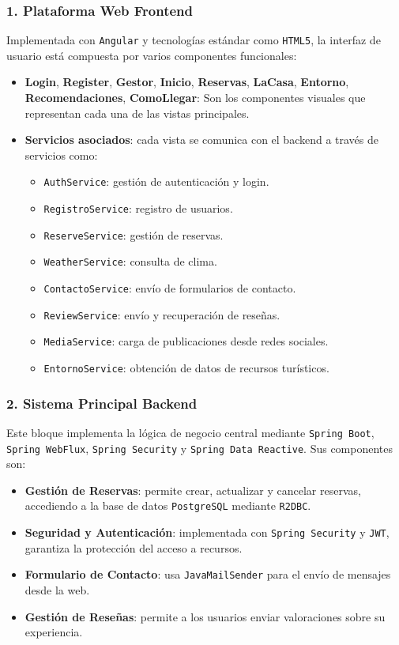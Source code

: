 \subsubsection*{1. Plataforma Web Frontend}
Implementada con \texttt{Angular} y tecnologías estándar como \texttt{HTML5}, la interfaz de usuario está compuesta por varios componentes funcionales:

\begin{itemize}
\item \textbf{Login}, \textbf{Register}, \textbf{Gestor}, \textbf{Inicio}, \textbf{Reservas}, \textbf{LaCasa}, \textbf{Entorno}, \textbf{Recomendaciones}, \textbf{ComoLlegar}:
Son los componentes visuales que representan cada una de las vistas principales.

\item \textbf{Servicios asociados}: cada vista se comunica con el backend a través de servicios como:
\begin{itemize}
    \item \texttt{AuthService}: gestión de autenticación y login.
    \item \texttt{RegistroService}: registro de usuarios.
    \item \texttt{ReserveService}: gestión de reservas.
    \item \texttt{WeatherService}: consulta de clima.
    \item \texttt{ContactoService}: envío de formularios de contacto.
    \item \texttt{ReviewService}: envío y recuperación de reseñas.
    \item \texttt{MediaService}: carga de publicaciones desde redes sociales.
    \item \texttt{EntornoService}: obtención de datos de recursos turísticos.
\end{itemize}
\end{itemize}

\subsubsection*{2. Sistema Principal Backend}
Este bloque implementa la lógica de negocio central mediante \texttt{Spring Boot}, \texttt{Spring WebFlux}, \texttt{Spring Security} y \texttt{Spring Data Reactive}. Sus componentes son:

\begin{itemize}
\item \textbf{Gestión de Reservas}: permite crear, actualizar y cancelar reservas, accediendo a la base de datos \texttt{PostgreSQL} mediante \texttt{R2DBC}.
\item \textbf{Seguridad y Autenticación}: implementada con \texttt{Spring Security} y \texttt{JWT}, garantiza la protección del acceso a recursos.
\item \textbf{Formulario de Contacto}: usa \texttt{JavaMailSender} para el envío de mensajes desde la web.
\item \textbf{Gestión de Reseñas}: permite a los usuarios enviar valoraciones sobre su experiencia.
\end{itemize}


